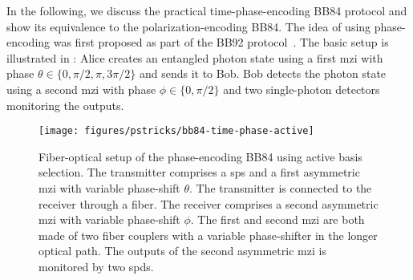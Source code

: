 In the following, we discuss the practical time-phase-encoding BB84 protocol and show its equivalence to the polarization-encoding BB84.
The idea of using phase-encoding was first proposed as part of the BB92 protocol~\cite{Bennett1992}.
The basic setup is illustrated in :
Alice creates an entangled photon state using a first \gls{mzi} with phase $\theta\in\{0,\pi/2,\pi,3\pi/2\}$ and sends it to Bob. Bob detects the photon state using a second \gls{mzi} with phase $\phi\in\{0,\pi/2\}$ and two single-photon detectors monitoring the outputs.
\begin{figure}[htb]
	\centering
	\texttt{[image: figures/pstricks/bb84-time-phase-active]}
	\caption{Fiber-optical setup of the phase-encoding BB84 using active basis selection. The transmitter comprises a \gls{sps} and a first asymmetric \gls{mzi} with variable phase-shift $\theta$. The transmitter is connected to the receiver through a fiber. The receiver comprises a second asymmetric \gls{mzi} with variable phase-shift $\phi$. The first and second \gls{mzi} are both made of two fiber couplers with a variable phase-shifter in the longer optical path. The outputs of the second asymmetric \gls{mzi} is monitored by two \gls{spd}s.}\label{fig:qubit_time_phase_active}
\end{figure}

